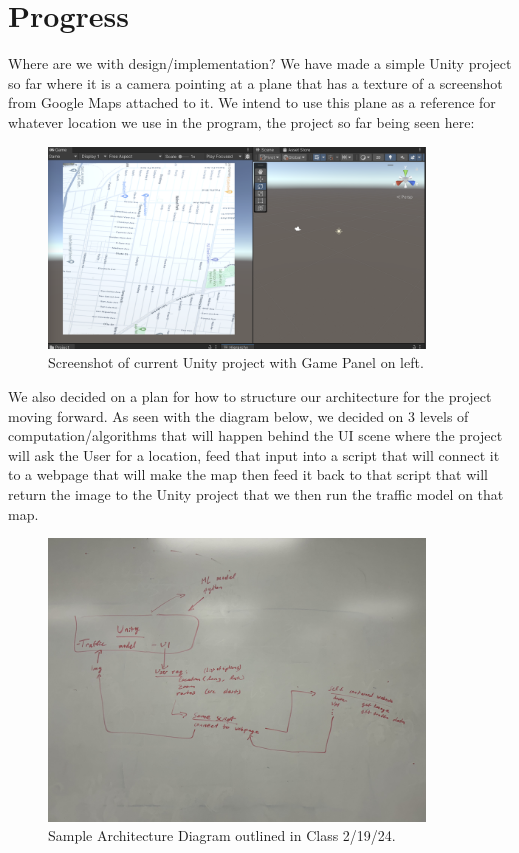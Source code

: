 \section{Progress}

Where are we with design/implementation? We have made a simple Unity project so far where it is a camera pointing at a plane that has a texture of a screenshot from Google Maps attached to it. We intend to use this plane as a reference for whatever location we use in the program, the project so far being seen here:

\begin{figure}[htb]
    \centering
    \includegraphics[width=10cm]{../Images/ProjectProgress1.png}
       \caption{Screenshot of current Unity project with Game Panel on left.}
           \label{Fig:UnityProject1}
  \end{figure}

\begin{flushleft}
We also decided on a plan for how to structure our architecture for the project moving forward. As seen with the diagram below, we decided on 3 levels of computation/algorithms that will happen behind the UI scene where the project will ask the User for a location, feed that input into a script that will connect it to a webpage that will make the map then feed it back to that script that will return the image to the Unity project that we then run the traffic model on that map. 
\end{flushleft}


\begin{figure}[htb]
    \centering
    \includegraphics[width=10cm]{../Images/ArchitectureDiagram.jpg}
       \caption{Sample Architecture Diagram outlined in Class 2/19/24.}
           \label{Fig:ArchitectureDiagram}
  \end{figure}


